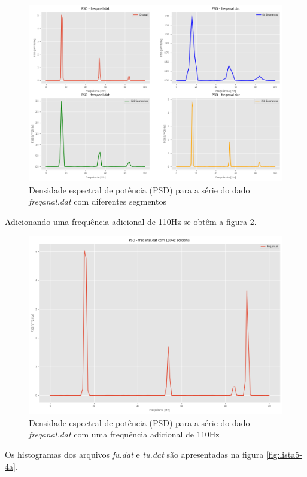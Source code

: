 \documentclass[12pt,a4paper,portuguese]{article}
\begin{document}
	\begin{figure}[H]
	\centering
	\includegraphics[width=1\linewidth]{lista5-3a}
	\caption{Densidade espectral de potência (PSD) para a série do dado \textit{freqanal.dat} com diferentes segmentos }
	\label{fig:lista5-3a}
\end{figure}

Adicionando uma frequência adicional de 110Hz se obtêm a figura  \ref{fig:lista5-3b}.

\begin{figure}[H]
	\centering
	\includegraphics[width=1\linewidth]{lista5-3b}
	\caption{Densidade espectral de potência (PSD) para a série do dado \textit{freqanal.dat} com  uma frequência adicional de 110Hz }
	\label{fig:lista5-3b}
\end{figure}


Os histogramas dos arquivos \textit{fu.dat} e \textit{tu.dat} são apresentadas na figura \ref{fig:lista5-4a}.
\end{document}

